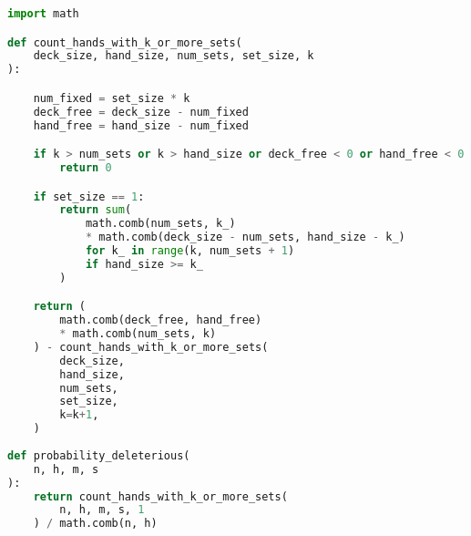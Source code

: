 \begin{lstlisting}[language=python, caption={Formula to calculate probability of deleterious outcome in nopout interpolation.}, label={lst:probability_deleterious}]
import math

def count_hands_with_k_or_more_sets(
    deck_size, hand_size, num_sets, set_size, k
):

    num_fixed = set_size * k
    deck_free = deck_size - num_fixed
    hand_free = hand_size - num_fixed

    if k > num_sets or k > hand_size or deck_free < 0 or hand_free < 0:
        return 0

    if set_size == 1:
        return sum(
            math.comb(num_sets, k_)
            * math.comb(deck_size - num_sets, hand_size - k_)
            for k_ in range(k, num_sets + 1)
            if hand_size >= k_
        )

    return (
        math.comb(deck_free, hand_free)
        * math.comb(num_sets, k)
    ) - count_hands_with_k_or_more_sets(
        deck_size,
        hand_size,
        num_sets,
        set_size,
        k=k+1,
    )
    
def probability_deleterious(
    n, h, m, s
):
    return count_hands_with_k_or_more_sets(
        n, h, m, s, 1
    ) / math.comb(n, h)

\end{lstlisting}
